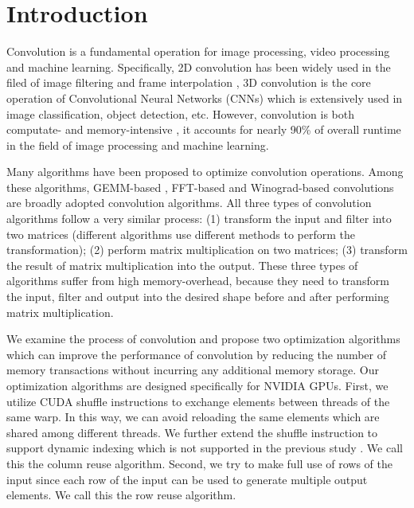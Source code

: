 \documentclass[sigplan,review,anonymous]{acmart}\settopmatter{printfolios=true,printccs=false,printacmref=false}
\begin{document}



\maketitle


\section{Introduction}
Convolution is a fundamental operation for image processing, video processing and machine learning. Specifically, 2D convolution has been widely used in the filed of image filtering and frame interpolation \cite{Perrot2014Fine} \cite{Ma2014Optimized} \cite{Rudi2015Image} \cite{Niklaus2017Video}, 3D convolution is the core operation of Convolutional Neural Networks (CNNs) which is extensively used in image classification, object detection, etc. However, convolution is both computate- and memory-intensive \cite{cavigelli2015accelerating}, it accounts for nearly 90\% of overall runtime \cite{Li2016Performance} in the field of image processing and machine learning. 

Many algorithms \cite{Iandola2014Communication} \cite{vasilache2014fast} \cite{lavin2016fast} \cite{cho2017mec} \cite{Zhen2018Optimizing} \cite{Vasudevan2017Parallel} \cite{Chellapilla2006High} have been proposed to optimize convolution operations. Among these algorithms, GEMM-based \cite{Vasudevan2017Parallel} \cite{Chellapilla2006High}, FFT-based \cite{vasilache2014fast} and Winograd-based convolutions \cite{lavin2016fast} are broadly adopted convolution algorithms. All three types of convolution algorithms follow a very similar process: (1) transform the input and filter into two matrices (different algorithms use different methods to perform the transformation); (2) perform matrix multiplication on two matrices; (3) transform the result of matrix multiplication into the output. These three types of algorithms suffer from high memory-overhead, because they need to transform the input, filter and output into the desired shape before and after performing matrix multiplication. 

We examine the process of convolution and propose two optimization algorithms which can improve the performance of convolution by reducing the number of memory transactions without incurring any additional memory storage. Our optimization algorithms are designed specifically for NVIDIA GPUs. First, we utilize CUDA shuffle instructions to exchange elements between threads of the same warp. In this way, we can avoid reloading the same elements which are shared among different threads. We further extend the shuffle instruction to support dynamic indexing which is not supported in the previous study \cite{vasilache2014fast}. We call this the column reuse algorithm. Second, we try to make full use of rows of the input since each row of the input can be used to generate multiple output elements. We call this the row reuse algorithm.
\end{document}
